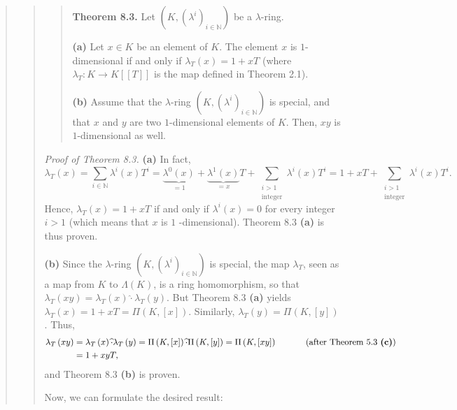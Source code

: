 \documentclass[12pt,final,notitlepage,onecolumn,german]{article}%
\begin{document}
\begin{quote}
\begin{quote}
\begin{quote}
\textbf{Theorem 8.3.} Let $\left(  K,\left(  \lambda^{i}\right)
_{i\in\mathbb{N}}\right)  $ be a $\lambda$-ring.

\textbf{(a)} Let $x\in K$ be an element of $K$. The element $x$ is
$1$-dimensional if and only if $\lambda_{T}\left(  x\right)  =1+xT$ (where
$\lambda_{T}:K\rightarrow K\left[  \left[  T\right]  \right]  $ is the map
defined in Theorem 2.1).

\textbf{(b)} Assume that the $\lambda$-ring $\left(  K,\left(  \lambda
^{i}\right)  _{i\in\mathbb{N}}\right)  $ is special, and that $x$ and $y$ are
two $1$-dimensional elements of $K$. Then, $xy$ is $1$-dimensional as well.
\end{quote}

\textit{Proof of Theorem 8.3.} \textbf{(a)} In fact,%
\[
\lambda_{T}\left(  x\right)  =\sum\limits_{i\in\mathbb{N}}\lambda^{i}\left(
x\right)  T^{i}=\underbrace{\lambda^{0}\left(  x\right)  }_{=1}+\underbrace
{\lambda^{1}\left(  x\right)  }_{=x}T+\sum
\limits_{\substack{i>1\\\text{integer}}}\lambda^{i}\left(  x\right)
T^{i}=1+xT+\sum\limits_{\substack{i>1\\\text{integer}}}\lambda^{i}\left(
x\right)  T^{i}.
\]
Hence, $\lambda_{T}\left(  x\right)  =1+xT$ if and only if $\lambda^{i}\left(
x\right)  =0$ for every integer $i>1$ (which means that $x$ is $1$%
-dimensional). Theorem 8.3 \textbf{(a)} is thus proven.

\textbf{(b)} Since the $\lambda$-ring $\left(  K,\left(  \lambda^{i}\right)
_{i\in\mathbb{N}}\right)  $ is special, the map $\lambda_{T}$, seen as a map
from $K$ to $\Lambda\left(  K\right)  $, is a ring homomorphism, so that
$\lambda_{T}\left(  xy\right)  =\lambda_{T}\left(  x\right)  \widehat{\cdot
}\lambda_{T}\left(  y\right)  $. But Theorem 8.3 \textbf{(a)} yields
$\lambda_{T}\left(  x\right)  =1+xT=\Pi\left(  K,\left[  x\right]  \right)  $.
Similarly, $\lambda_{T}\left(  y\right)  =\Pi\left(  K,\left[  y\right]
\right)  $. Thus,%
\begin{align*}
\lambda_{T}\left(  xy\right)   &  =\lambda_{T}\left(  x\right)  \widehat
{\cdot}\lambda_{T}\left(  y\right)  =\Pi\left(  K,\left[  x\right]  \right)
\widehat{\cdot}\Pi\left(  K,\left[  y\right]  \right)  =\Pi\left(  K,\left[
xy\right]  \right)  \ \ \ \ \ \ \ \ \ \ \left(  \text{after Theorem 5.3
\textbf{(c)}}\right) \\
&  =1+xyT,
\end{align*}
and Theorem 8.3 \textbf{(b)} is proven.

Now, we can formulate the desired result:


\end{quote}
\end{quote}
\end{document}
